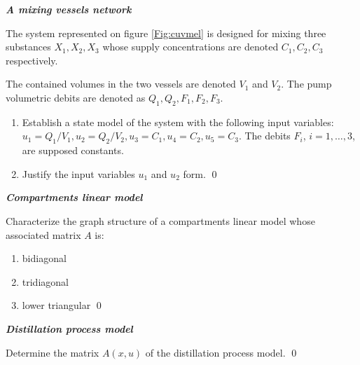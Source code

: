 \begin{exercice}{\bf \em A mixing vessels network}

The system represented on figure \ref{Fig:cuvmel} is designed for mixing three substances $X_1, X_2, X_3$ 
whose supply concentrations are denoted $C_1, C_2, C_3$ respectively.

The contained volumes in the two vessels are denoted $V_1$ and $V_2$. 
The pump volumetric debits are denoted as $Q_1, Q_2, F_1, F_2, F_3$.

\begin{enumerate}
\item Establish a state model of the system with the following input variables: 
$u_1 = Q_1/V_1, u_2 = Q_2/V_2, u_3 = C_1, u_4 = C_2, u_5 = C_3$. 
The debits $F_i$, $i = 1, \dots , 3$, are supposed constants.
\item Justify the input variables $u_1$ and $u_2$ form. \qed
\end{enumerate}
\end{exercice}
\vv

\begin{exercice}{\bf \em Compartments linear model}

Characterize the graph structure of a compartments linear model whose associated matrix $A$ is:
\begin{enumerate}
\item bidiagonal
\item tridiagonal
\item lower triangular \qed
\end{enumerate}
\end{exercice}
\vv

\begin{exercice}{\bf \em Distillation process model}

Determine the matrix $A(x,u)$ of the distillation process model. \qed
\end{exercice}
\vv

